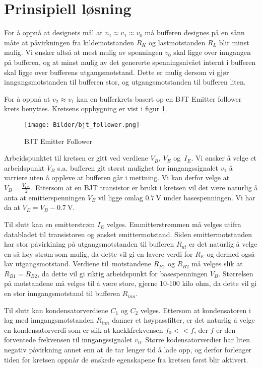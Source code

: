 \section{Prinsipiell løsning}
\label{prinsipiellLoesning}

For å oppnå at designets mål at $v_2 \approx v_1 \approx v_0$ må bufferen designes på en sånn måte
at påvirkningen fra kildemotstanden $R_K$ og lastmotstanden $R_L$ blir minst mulig. Vi ønsker altså at mest 
mulig av spenningen $v_0$ skal ligge over inngangen på bufferen, og at minst mulig av det genererte 
spenningsnivået internt i bufferen skal ligge over bufferens utgangsmotstand. Dette er mulig dersom 
vi gjør inngangsmotstanden til bufferen stor, og utgangsmotstanden til bufferen liten.

For å oppnå at $v_2 \approx v_1$ kan en bufferkrets basert op en BJT Emitter follower krets benyttes. 
Kretsens oppbygning er vist i figur \ref{fig:bjt_voltage_follower}.

\begin{figure}[H]
    \centering 
    \texttt{[image: Bilder/bjt\_follower.png]}
    \caption{BJT Emitter Follower \cite{bjt_follower}}
    \label{fig:bjt_voltage_follower}
\end{figure}

Arbeidspunktet til kretsen er gitt ved verdiene $V_B$, $V_E$ og $I_E$. Vi ønsker å velge et arbeidspunkt 
$V_B$ s.a. bufferen git størst mulighet for inngangssignalet $v_1$ å varriere uten å oppleve at bufferen 
går i mettning. Vi kan derfor velge at $V_B = \frac{V_{CC}}{2}$. Ettersom at en BJT transistor er brukt i kretsen 
vil det være naturlig å anta at emitterspenningen $V_E$ vil ligge omlag $\SI{0.7}{\volt}$ under basespenningen.
Vi har da at $V_E = V_B - \SI{0.7}{\volt}$. 

Til slutt kan en emitterstrøm $I_E$ velges. Emmitterstrømmen må velges utifra databladet til transistoren 
og ønsket emittermotstand. Siden emittermotstanden har stor påvirkining på utgangsmotstanden til 
bufferen $R_{ut}$ er det naturlig å velge en så høy strøm som mulig, da dette vil gi en lavere 
verdi for $R_E$ og dermed også lav utgangsmotstand. Verdiene til motstandene $R_{B1}$ og $R_{B2}$ må velges 
slik at $R_{B1} = R_{B2}$, da dette vil gi riktig arbeidspunkt for basespenningen $V_B$. Størrelsen på 
motstandene må velges til å være store, gjerne 10-100 kilo ohm, da dette vil gi en stor inngangsmotstand til 
bufferen $R_{inn}$. 

Til slutt kan kondensatorverdiene $C_1$ og $C_2$ velges. Ettersom at kondensatoren i lag med 
inngangsmotstanden $R_{inn}$ danner et høypassfilter, er det naturlig å velge en kondensatorverdi som 
er slik at knekkfrekvensen $f_0 << f$, der $f$ er den forventede frekvensen til inngangssignalet $v_0$.
Større kodensatorverdier har liten negativ påvirkning annet enn at de tar lenger tid å lade opp, og derfor 
forlenger tiden før kretsen oppnår de ønskede egenskapene fra kretsen først blir aktivert.
